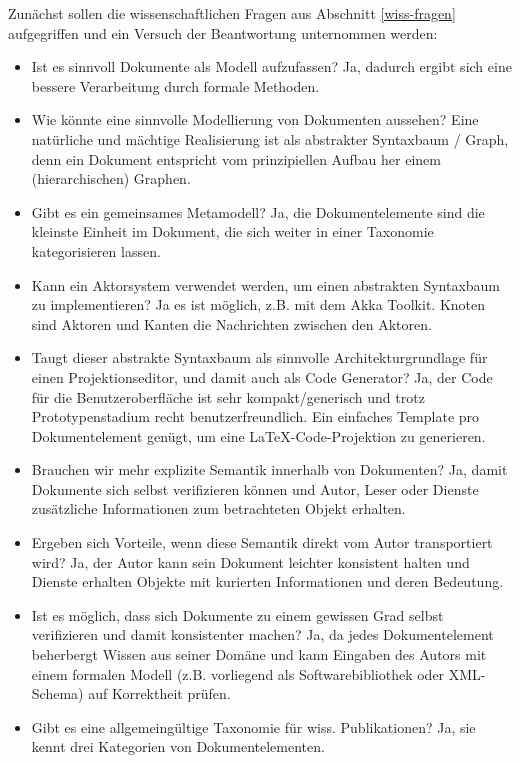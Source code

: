 Zunächst sollen die wissenschaftlichen Fragen aus Abschnitt \ref{wiss-fragen} aufgegriffen und  ein Versuch der Beantwortung unternommen werden:

 
\begin{itemize}

\item Ist es sinnvoll Dokumente als Modell aufzufassen? Ja, dadurch ergibt sich eine bessere Verarbeitung durch formale Methoden.
\item Wie könnte eine sinnvolle Modellierung von Dokumenten aussehen? Eine natürliche und mächtige Realisierung ist als abstrakter Syntaxbaum / Graph, denn ein Dokument entspricht vom prinzipiellen Aufbau her einem (hierarchischen) Graphen.
\item Gibt es ein gemeinsames Metamodell? Ja, die Dokumentelemente sind die kleinste Einheit im Dokument, die sich weiter in einer Taxonomie kategorisieren lassen.
\item Kann ein Aktorsystem verwendet werden, um einen abstrakten Syntaxbaum zu implementieren? Ja es ist möglich, z.B. mit dem Akka Toolkit. Knoten sind Aktoren und Kanten die Nachrichten zwischen den Aktoren.
\item Taugt dieser abstrakte Syntaxbaum als sinnvolle Architekturgrundlage für einen Projektionseditor, und damit auch als Code Generator? Ja, der Code für die Benutzeroberfläche ist sehr kompakt/generisch und trotz Prototypenstadium recht benutzerfreundlich. Ein einfaches Template pro Dokumentelement genügt, um eine LaTeX-Code-Projektion zu generieren.
\item Brauchen wir mehr explizite Semantik innerhalb von Dokumenten? Ja, damit Dokumente sich selbst verifizieren können und Autor, Leser oder Dienste zusätzliche Informationen zum betrachteten Objekt erhalten.
\item Ergeben sich Vorteile, wenn diese Semantik direkt vom Autor transportiert wird? Ja, der Autor kann sein Dokument leichter konsistent halten und Dienste erhalten Objekte mit kurierten Informationen und deren Bedeutung.
\item Ist es möglich, dass sich Dokumente zu einem gewissen Grad selbst verifizieren und damit konsistenter machen? Ja, da jedes Dokumentelement beherbergt Wissen aus seiner Domäne und kann Eingaben des Autors mit einem formalen Modell (z.B. vorliegend als Softwarebibliothek oder XML-Schema) auf Korrektheit prüfen.
\item Gibt es eine allgemeingültige Taxonomie für wiss. Publikationen? Ja, sie kennt drei Kategorien von Dokumentelementen.
\end{itemize}
 
